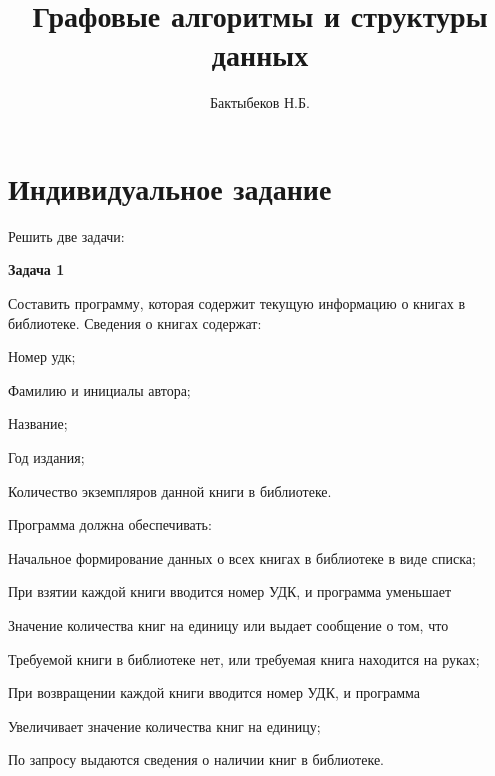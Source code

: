 

\title{Графовые алгоритмы и структуры данных}
\author{Бактыбеков Н.Б.}





\newpage
\tableofcontents{}
\setcounter{page}{1}

\newpage
{}


\section*{Индивидуальное задание}
Решить две задачи:

\textbf{Задача 1}


Составить программу, которая содержит текущую информацию о книгах в библиотеке.
Сведения о книгах содержат:

\begin{compactitem}
    \item Номер удк;
    \item Фамилию и инициалы автора;
    \item Название;
    \item Год издания;
    \item Количество экземпляров данной книги в библиотеке.
\end{compactitem}

Программа должна обеспечивать:

\begin{compactitem}
    \item Начальное формирование данных о всех книгах в библиотеке в виде списка;
    \item При взятии каждой книги вводится номер УДК, и программа уменьшает 
    \item Значение количества книг на единицу или выдает сообщение о том, что 
    \item Требуемой книги в библиотеке нет, или требуемая книга находится на руках;
    \item При возвращении каждой книги вводится номер УДК, и программа 
    \item Увеличивает значение количества книг на единицу;
    \item По запросу выдаются сведения о наличии книг в библиотеке.
\end{compactitem}


